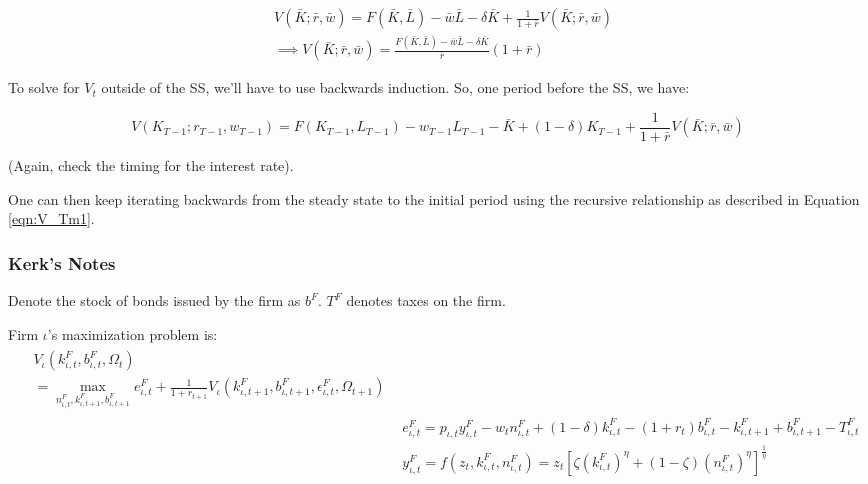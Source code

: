 \documentclass[letterpaper,12pt]{article}
\theoremstyle{definition}
\begin{document}
\begin{spacing}{1.5}
      \begin{equation}
      \label{eqn:V_ss}
      \begin{split}
      & V(\bar{K};\bar{r},\bar{w})=F(\bar{K},\bar{L}) - \bar{w}\bar{L}  - \delta\bar{K} + \frac{1}{1+\bar{r}}V(\bar{K};\bar{r},\bar{w})\\
      & \implies V(\bar{K};\bar{r},\bar{w}) = \frac{F(\bar{K},\bar{L}) - \bar{w}\bar{L}  - \delta\bar{K} }{\bar{r}} (1+\bar{r})
      \end{split}
      \end{equation}
       
      To solve for $V_{t}$ outside of the SS, we'll have to use backwards induction.  So, one period before the SS, we have:
       
      \begin{equation}
      \label{eqn:V_Tm1}
      V(K_{T-1};r_{T-1},w_{T-1})=F(K_{T-1},L_{T-1}) - w_{T-1}L_{T-1}  - \bar{K} + (1- \delta)K_{T-1} + \frac{1}{1+\bar{r}}V(\bar{K};\bar{r},\bar{w})
      \end{equation}

      (Again, check the timing for the interest rate).  

      One can then keep iterating backwards from the steady state to the initial period using the recursive relationship as described in Equation \ref{eqn:V_Tm1}.  

    \subsubsection{Kerk's Notes}
      Denote the stock of bonds issued by the firm as $b^F$.  $T^F$ denotes taxes on the firm.

      Firm $\iota$'s maximization problem is:
      \begin{align}
         \begin{split}
         & V_\iota(k^F_{\iota,t},b^F_{\iota,t},\Omega_t) \\
         & = \max_{n^F_{\iota,t},k^F_{\iota,t+1},b^F_{\iota,t+1}} e^F_{\iota,t}  + \frac{1}{1+r_{t+1}} V_\iota(k^F_{\iota,t+1},b^F_{\iota,t+1},\epsilon^F_{\iota,t},\Omega_{t+1}) \label{EqProfMax}
         \end{split} \\
         & e^F_{\iota,t} = p_{\iota,t} y^F_{\iota,t} - w_tn^F_{\iota,t} + (1-\delta)k^F_{\iota,t} - (1+r_t)b^F_{\iota,t} - k^F_{\iota,t+1} + b^F_{\iota,t+1} -T^F_{\iota,t} \label{EqEarn} \\
         & y^F_{\iota,t} = f(z_t,k^F_{\iota,t},n^F_{\iota,t}) = z_t \left[ \zeta (k^F_{\iota,t})^\eta + (1-\zeta)(n^F_{\iota,t})^\eta \right]^{\frac{1}{\eta}} \label{EqProd}
      \end{align}


\end{spacing}
\end{document}
